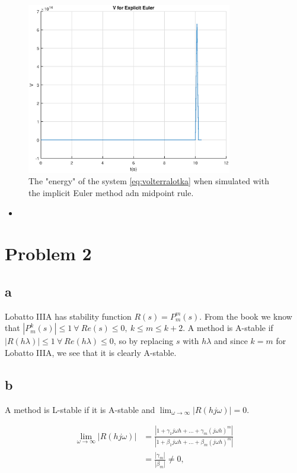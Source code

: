 \documentclass{article}
\newcommand{\matlabscript}[2]{\begin{itemize}\item[]\end{itemize}}
\begin{document}
\begin{figure}[H]
    \centering
    \includegraphics[width = 0.8\textwidth]{modsim_ex6_1d_vee}
    \caption{The "energy" of the system \ref{eq:volterralotka} when simulated with the implicit Euler method adn midpoint rule.}
    \label{fig:1d_v}
\end{figure}

\matlabscript{ModSim_ex6_1d}{Code for simulating the system from \ref{eq:volterralotka} in MATLAB with Euler and implicit Euler and implicit midpoint rule methods.}

\section{Problem 2}

\subsection{a}

Lobatto IIIA has stability function $R(s) = P_m^m(s)$. 
From the book we know that $|P_m^k(s)| \leq 1 \: \forall \: Re(s) \leq 0, \: k\leq m \leq k+2$.
A method is A-stable if $|R(h\lambda)| \leq 1 \: \forall \: Re(h\lambda) \leq 0$, so by replacing $s$ with $h\lambda$ and since $k=m$ for Lobatto IIIA, we see that it is clearly A-stable.

\subsection{b}

A method is L-stable if it is A-stable and $\lim_{\omega\to \infty}|R(hj\omega)| = 0$.

\begin{align*}
    \lim_{\omega\to \infty}|R(hj\omega)| &=\frac{|1 + \gamma_1j\omega h + ... +\gamma_m(j\omega h)^m|}{|1 + \beta_1j\omega h + ... + \beta_m(j\omega h)^m|} \\
    &= \frac{|\gamma_m|}{|\beta_m|} \neq 0,
\end{align*}
\end{document}
